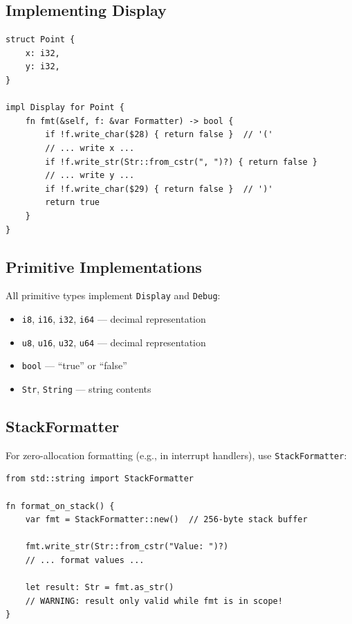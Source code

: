 \subsection{Implementing Display}

\begin{lstlisting}
struct Point {
    x: i32,
    y: i32,
}

impl Display for Point {
    fn fmt(&self, f: &var Formatter) -> bool {
        if !f.write_char($28) { return false }  // '('
        // ... write x ...
        if !f.write_str(Str::from_cstr(", ")?) { return false }
        // ... write y ...
        if !f.write_char($29) { return false }  // ')'
        return true
    }
}
\end{lstlisting}

\subsection{Primitive Implementations}

All primitive types implement \texttt{Display} and \texttt{Debug}:

\begin{itemize}
    \item \texttt{i8}, \texttt{i16}, \texttt{i32}, \texttt{i64} --- decimal representation
    \item \texttt{u8}, \texttt{u16}, \texttt{u32}, \texttt{u64} --- decimal representation
    \item \texttt{bool} --- ``true'' or ``false''
    \item \texttt{Str}, \texttt{String} --- string contents
\end{itemize}

\subsection{StackFormatter}

For zero-allocation formatting (e.g., in interrupt handlers), use \texttt{StackFormatter}:

\begin{lstlisting}
from std::string import StackFormatter

fn format_on_stack() {
    var fmt = StackFormatter::new()  // 256-byte stack buffer

    fmt.write_str(Str::from_cstr("Value: ")?)
    // ... format values ...

    let result: Str = fmt.as_str()
    // WARNING: result only valid while fmt is in scope!
}
\end{lstlisting}

